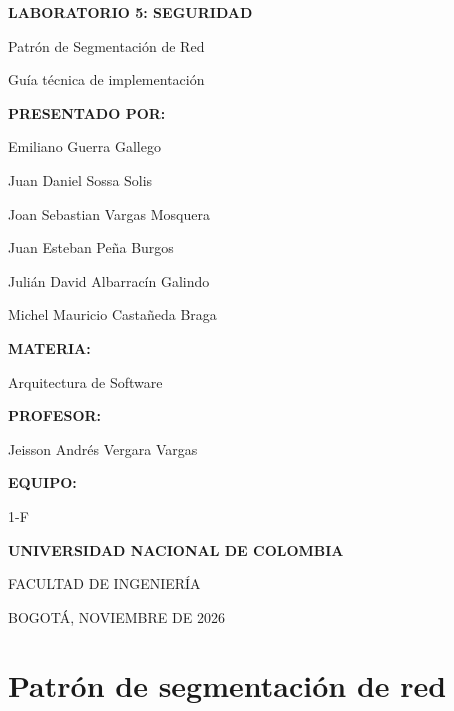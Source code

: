\documentclass[11pt,letterpaper]{article}
\begin{document}
\begin{titlepage}
  \centering
  \vspace*{2.5cm}
  {\LARGE\bfseries LABORATORIO 5: SEGURIDAD\par}
  \vspace{0.5cm}
  {\Large Patrón de Segmentación de Red\par}
  \vspace{0.2cm}
  {\large Guía técnica de implementación\par}

  \vspace{1.6cm}
  {\bfseries PRESENTADO POR:\par}
  \vspace{0.15cm}
  Emiliano Guerra Gallego\par
  Juan Daniel Sossa Solis\par
  Joan Sebastian Vargas Mosquera\par
  Juan Esteban Peña Burgos\par
  Julián David Albarracín Galindo\par
  Michel Mauricio Castañeda Braga\par

  \vspace{1cm}
  {\bfseries MATERIA:\par}
  Arquitectura de Software\par

  \vspace{1cm}
  {\bfseries PROFESOR:\par}
  Jeisson Andrés Vergara Vargas\par

  \vspace{1cm}
  {\bfseries EQUIPO:\par}
  1-F\par

  \vfill
  {\bfseries UNIVERSIDAD NACIONAL DE COLOMBIA\par
  FACULTAD DE INGENIERÍA\par
  BOGOTÁ, NOVIEMBRE DE 2026\par}
\end{titlepage}

\section{Patrón de segmentación de red}
\end{document}

